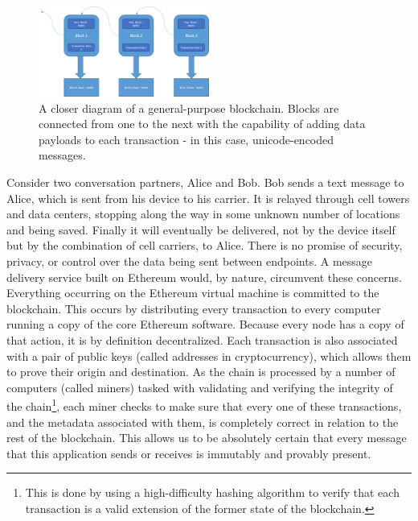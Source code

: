 \documentclass[]{report}
\begin{document}
\begin{figure}[h]
    \centering
    \includegraphics[width=0.5\textwidth]{blockchain}
    \caption{A closer diagram of a general-purpose blockchain. Blocks are connected from one to the next with the capability of adding data payloads to each transaction - in this case, unicode-encoded messages.}
\end{figure}

Consider two conversation partners, Alice and Bob. Bob sends a text message to Alice, which is sent from his device to his carrier. It is relayed through cell towers and data centers, stopping along the way in some unknown number of locations and being saved. Finally it will eventually be delivered, not by the device itself but by the combination of cell carriers, to Alice. There is no promise of security, privacy, or control over the data being sent between endpoints. A message delivery service built on Ethereum would, by nature, circumvent these concerns. Everything occurring on the Ethereum virtual machine is committed to the blockchain. This occurs by distributing every \gls{transaction} to every computer running a copy of the core Ethereum software. Because every \gls{node} has a copy of that action, it is by definition decentralized. Each transaction is also associated with a pair of public keys (called addresses in cryptocurrency), which allows them to prove their origin and destination. As the chain is processed by a number of computers (called miners) tasked with validating and verifying the integrity of the chain\footnote{This is done by using a high-difficulty hashing algorithm to verify that each transaction is a valid extension of the former state of the blockchain.}, each \gls{miner} checks to make sure that every one of these transactions, and the metadata associated with them, is completely correct in relation to the rest of the \gls{blockchain}. This allows us to be absolutely certain that every message that this application sends or receives is immutably and provably present.\cite{blockchain}\\
\end{document}
